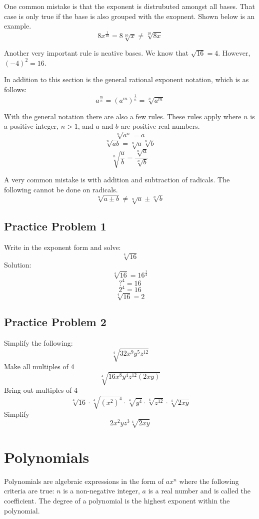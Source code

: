 \documentclass[12pt, letterpaper, oneside]{book}
\begin{document}
One common mistake is that the exponent is distrubuted amongst all bases. That case is only true if the base is also grouped with the exopnent. Shown below is an example.
\[8x^{\frac{1}{10}} =8\sqrt[10]{x} \neq \sqrt[10]{8x} \]

Another very important rule is neative bases. We know that $\sqrt{16} = 4$. However, $(-4)^2 = 16$.

In addition to this section is the general rational exponent notation, which is as follows:
\begin{equation}
    a^{\frac{m}{n}} = (a^m)^{\frac{1}{n}} = \sqrt[n]{a^m}
\end{equation}

With the general notation there are also a few rules. These rules apply where $n$ is a positive integer, $n >1$, and $a$ and $b$ are positive real numbers.
\begin{equation}
    \sqrt[n]{a^n} = a
\end{equation}
\begin{equation}
    \sqrt[n]{ab} = \sqrt[n]{a}\sqrt[n]{b}
\end{equation}
\begin{equation}
    \sqrt[n]{\frac{a}{b}} = \frac{\sqrt[n]{a}}{\sqrt[n]{b}}
\end{equation}

A very common mistake is with addition and subtraction of radicals. The following cannot be done on radicals.
\[\sqrt[n]{a \pm b} \neq \sqrt[n]{a} \pm \sqrt[n]{b} \]

\subsection{Practice Problem 1}
Write in the exponent form and solve:
\[ \sqrt[4]{16} \]
Solution:
\[ \sqrt[4]{16} = 16^{\frac{1}{4}} \]
\[?^4 = 16\]
\[2^4 = 16\]
\[ \sqrt[4]{16} = 2 \]

\subsection{Practice Problem 2}
Simplify the following:
\[\sqrt[4]{32 x^9 y^5 z^{12}}\]
Make all multiples of 4
\[ \sqrt[4]{16 x^8 y^4 z^{12} (2xy)} \]
Bring out multiples of 4
\[ \sqrt[4]{16} \cdot \sqrt[4]{(x^2)^4} \cdot \sqrt[4]{y^4} \cdot \sqrt[4]{z^{12}} \cdot \sqrt[4]{2xy}\]
Simplify
\[2x^2yz^3\sqrt[4]{2xy}\]

\section{Polynomials}
Polynomials are algebraic expressions in the form of $ax^n$ where the following criteria are true: $n$ is a non-negative integer, $a$ is a real number and is called the coefficient. The degree of a polynomial is the highest exponent within the polynomial.
\end{document}

